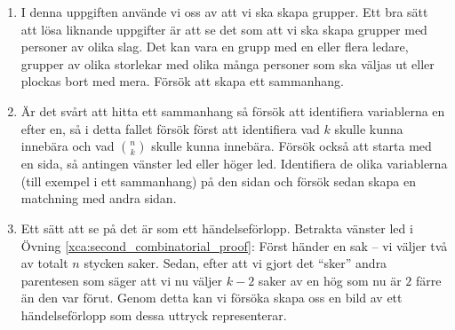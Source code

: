 \documentclass[nobib]{tufte-handout}
\begin{document}
\begin{solution}
	\begin{tips}
		\begin{enumerate}
			\item I denna uppgiften använde vi oss av att vi ska skapa grupper. Ett bra sätt att lösa liknande uppgifter är att se det som att vi ska skapa grupper med personer av olika slag. Det kan vara en grupp med en eller flera ledare, grupper av olika storlekar med olika många personer som ska väljas ut eller plockas bort med mera. Försök att skapa ett sammanhang.
			\item Är det svårt att hitta ett sammanhang så försök att identifiera variablerna en efter en, så i detta fallet försök först att identifiera vad $k$ skulle kunna innebära och vad $\binom{n}{k}$ skulle kunna innebära. Försök också att starta med en sida, så antingen vänster led eller höger led. Identifiera de olika variablerna (till exempel i ett sammanhang) på den sidan och försök sedan skapa en matchning med andra sidan.
			\item Ett sätt att se på det är som ett händelseförlopp. Betrakta vänster led i Övning \ref{xca:second_combinatorial_proof}: Först händer en sak -- vi väljer två av totalt $n$ stycken saker. Sedan, efter att vi gjort det ``sker'' andra parentesen som säger att vi nu väljer $k-2$ saker av en hög som nu är $2$ färre än den var förut. Genom detta kan vi försöka skapa oss en bild av ett händelseförlopp som dessa uttryck representerar. 
		\end{enumerate}
	\end{tips}
\end{solution}
\end{document}
